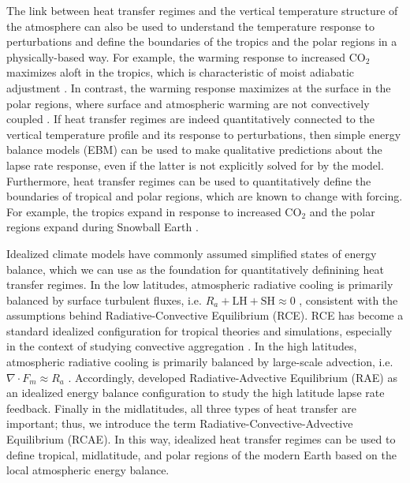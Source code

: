 \documentclass{ametsocV5}
\begin{document}
The link between heat transfer regimes and the vertical temperature structure of the atmosphere can also be used to understand the temperature response to perturbations and define the boundaries of the tropics and the polar regions in a physically-based way. For example, the warming response to increased CO$_2$ maximizes aloft in the tropics, which is characteristic of moist adiabatic adjustment \citep{held1993,romps2011,miyawaki2020}. In contrast, the warming response maximizes at the surface in the polar regions, where surface and atmospheric warming are not convectively coupled \citep{manabe1975,held1993,graversen2008,payne2015,cronin2016}. If heat transfer regimes are indeed quantitatively connected to the vertical temperature profile and its response to perturbations, then simple energy balance models (EBM) can be used to make qualitative predictions about the lapse rate response, even if the latter is not explicitly solved for by the model. Furthermore, heat transfer regimes can be used to quantitatively define the boundaries of tropical and polar regions, which are known to change with forcing. For example, the tropics expand in response to increased CO$_2$ \citep{seidel2007} and the polar regions expand during Snowball Earth \citep{pierrehumbert2005}.

Idealized climate models have commonly assumed simplified states of energy balance, which we can use as the foundation for quantitatively definining heat transfer regimes. In the low latitudes, atmospheric radiative cooling is primarily balanced by surface turbulent fluxes, i.e. $R_a + \mathrm{LH + SH}\approx 0$ \citep{riehl1958}, consistent with the assumptions behind Radiative-Convective Equilibrium (RCE). RCE has become a standard idealized configuration for tropical theories \citep[e.g.,][]{emanuel1996,nilsson1999,romps2014,singh2015} and simulations, especially in the context of studying convective aggregation \citep[][and the references therein]{wing2018}. In the high latitudes, atmospheric radiative cooling is primarily balanced by large-scale advection, i.e. $\nabla\cdot F_m \approx R_a$ \citep{nakamura1988}. Accordingly, \cite{cronin2016} developed Radiative-Advective Equilibrium (RAE) as an idealized energy balance configuration to study the high latitude lapse rate feedback. Finally in the midlatitudes, all three types of heat transfer are important; thus, we introduce the term Radiative-Convective-Advective Equilibrium (RCAE). In this way, idealized heat transfer regimes can be used to define tropical, midlatitude, and polar regions of the modern Earth based on the local atmospheric energy balance.
\end{document}
